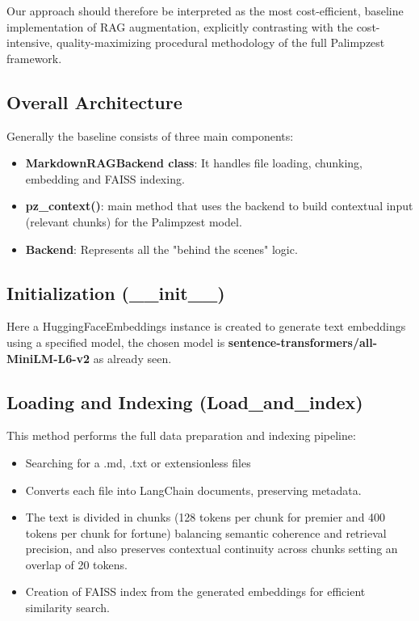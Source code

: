 Our approach should therefore be interpreted as the most cost-efficient, baseline implementation of RAG augmentation, explicitly contrasting with the cost-intensive, quality-maximizing procedural methodology of the full Palimpzest framework.

\subsection{Overall Architecture}
Generally the baseline consists of three main components:
\begin{itemize}
    \item \textbf{MarkdownRAGBackend class}: It handles file loading, chunking, embedding and FAISS indexing.
    \item \textbf{pz\_context()}: main method that uses the backend to build contextual input (relevant chunks) for the Palimpzest model.
    \item \textbf{Backend}: Represents all the "behind the scenes" logic.
\end{itemize}

\subsection{Initialization (\_\_init\_\_)}
Here a HuggingFaceEmbeddings instance is created to generate text embeddings using a specified model, the chosen model is \textbf{sentence-transformers/all-MiniLM-L6-v2} as already seen.

\subsection{Loading and Indexing (Load\_and\_index)}
This method performs the full data preparation and indexing pipeline:
\begin{itemize}
    \item Searching for a .md, .txt or extensionless files 
    \item Converts each file into LangChain documents, preserving metadata.
    \item The text is divided in chunks (128 tokens per chunk for premier and 400 tokens per chunk for fortune) balancing semantic coherence and retrieval precision, and also preserves contextual continuity across chunks setting an overlap of 20 tokens.
    \item Creation of FAISS index from the generated embeddings for efficient similarity search.
\end{itemize}

